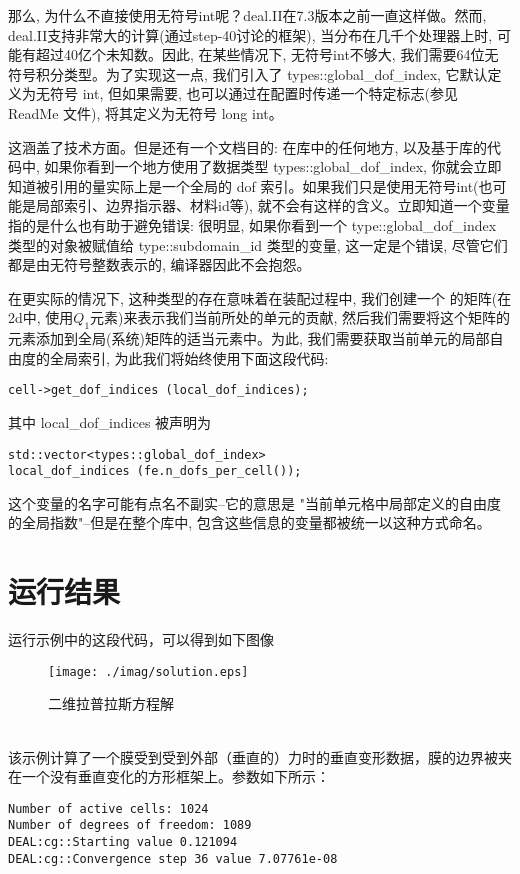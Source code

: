 \documentclass[12pt, a4paper, oneside]{ctexart}
\begin{document}
那么, 为什么不直接使用无符号int呢？deal.II在7.3版本之前一直这样做。然而, deal.II支持非常大的计算(通过step-40讨论的框架), 当分布在几千个处理器上时, 可能有超过40亿个未知数。因此, 在某些情况下, 无符号int不够大, 我们需要64位无符号积分类型。为了实现这一点, 我们引入了 types::global\_dof\_index, 它默认定义为无符号 int, 但如果需要, 也可以通过在配置时传递一个特定标志(参见 ReadMe 文件), 将其定义为无符号 long int。

这涵盖了技术方面。但是还有一个文档目的: 在库中的任何地方, 以及基于库的代码中, 如果你看到一个地方使用了数据类型 types::global\_dof\_index, 你就会立即知道被引用的量实际上是一个全局的 dof 索引。如果我们只是使用无符号int(也可能是局部索引、边界指示器、材料id等), 就不会有这样的含义。立即知道一个变量指的是什么也有助于避免错误: 很明显, 如果你看到一个 type::global\_dof\_index 类型的对象被赋值给 type::subdomain\_id 类型的变量, 这一定是个错误, 尽管它们都是由无符号整数表示的, 编译器因此不会抱怨。

在更实际的情况下, 这种类型的存在意味着在装配过程中, 我们创建一个
的矩阵(在2d中, 使用$Q_1$元素)来表示我们当前所处的单元的贡献, 然后我们需要将这个矩阵的元素添加到全局(系统)矩阵的适当元素中。为此, 我们需要获取当前单元的局部自由度的全局索引, 为此我们将始终使用下面这段代码: 
\lstset{language=C++}
\begin{lstlisting}
cell->get_dof_indices (local_dof_indices);
\end{lstlisting}
其中 local\_dof\_indices 被声明为
\lstset{language=C++}
\begin{lstlisting}
std::vector<types::global_dof_index> 
local_dof_indices (fe.n_dofs_per_cell());
\end{lstlisting}
这个变量的名字可能有点名不副实--它的意思是 "当前单元格中局部定义的自由度的全局指数"--但是在整个库中, 包含这些信息的变量都被统一以这种方式命名。
\section{运行结果}
运行示例中的这段代码，可以得到如下图像
    \begin{figure}[ht]
    \centering
    \texttt{[image: ./imag/solution.eps]}
    \caption{二维拉普拉斯方程解}
    \end{figure}
\\    
该示例计算了一个膜受到受到外部（垂直的）力时的垂直变形数据，膜的边界被夹在一个没有垂直变化的方形框架上。参数如下所示：
\lstset{language=C}
\begin{lstlisting}
Number of active cells: 1024
Number of degrees of freedom: 1089
DEAL:cg::Starting value 0.121094
DEAL:cg::Convergence step 36 value 7.07761e-08
\end{lstlisting}
\end{document}
